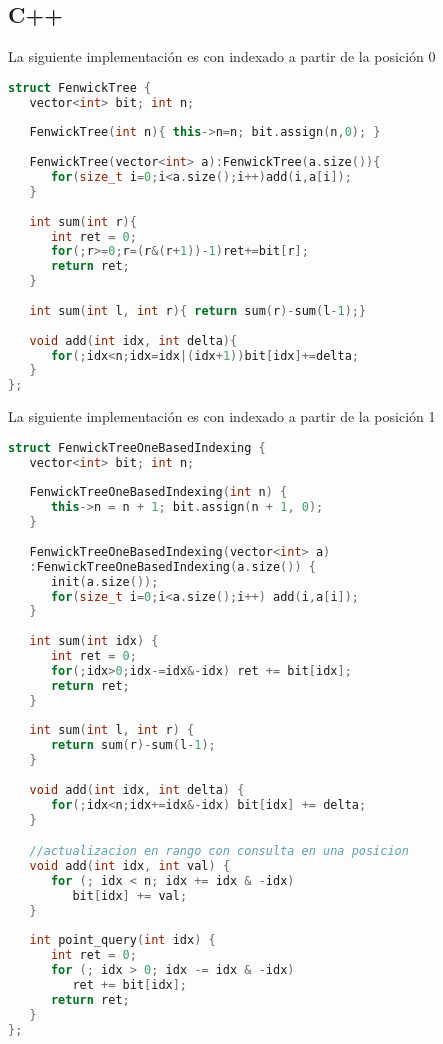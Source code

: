 \subsection{C++}
La siguiente implementación es con indexado a partir de la posición 0
\begin{lstlisting}[language=C++]
struct FenwickTree {
   vector<int> bit; int n;
   
   FenwickTree(int n){ this->n=n; bit.assign(n,0); }
	
   FenwickTree(vector<int> a):FenwickTree(a.size()){
      for(size_t i=0;i<a.size();i++)add(i,a[i]);
   }
	
   int sum(int r){
      int ret = 0;
      for(;r>=0;r=(r&(r+1))-1)ret+=bit[r];
      return ret;
   }
	
   int sum(int l, int r){ return sum(r)-sum(l-1);}
	
   void add(int idx, int delta){
      for(;idx<n;idx=idx|(idx+1))bit[idx]+=delta;
   }
};
\end{lstlisting}

La siguiente implementación es con indexado a partir de la posición 1
\begin{lstlisting}[language=C++]
struct FenwickTreeOneBasedIndexing {
   vector<int> bit; int n;
	
   FenwickTreeOneBasedIndexing(int n) {
      this->n = n + 1; bit.assign(n + 1, 0);
   }
	
   FenwickTreeOneBasedIndexing(vector<int> a)
   :FenwickTreeOneBasedIndexing(a.size()) {
      init(a.size());
      for(size_t i=0;i<a.size();i++) add(i,a[i]);
   }
	
   int sum(int idx) {
      int ret = 0;
      for(;idx>0;idx-=idx&-idx) ret += bit[idx];
      return ret;
   }
	
   int sum(int l, int r) {
      return sum(r)-sum(l-1);
   }
	
   void add(int idx, int delta) {
      for(;idx<n;idx+=idx&-idx) bit[idx] += delta;
   }

   //actualizacion en rango con consulta en una posicion
   void add(int idx, int val) {
      for (; idx < n; idx += idx & -idx)
         bit[idx] += val;
   }
   
   int point_query(int idx) {
      int ret = 0;
      for (; idx > 0; idx -= idx & -idx)
         ret += bit[idx];
      return ret;
   }
};
\end{lstlisting}
